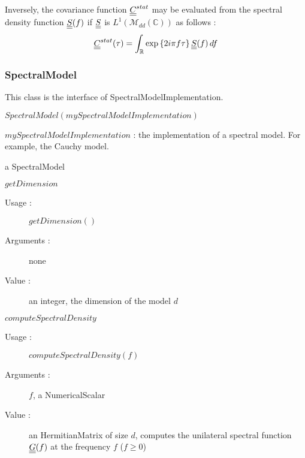 Inversely, the  covariance function ${\underline{\underline{C}}}^{stat}$ may be evaluated from the spectral density function ${\underline{\underline{S}}}(f)$  if ${\underline{\underline{S}}}$ is $L^1(\mathcal{M}_{dd}(\mathbb{C}))$ as follows :
\begin{equation} \label{cspectransform}
  {\underline{\underline{C}}}^{stat}(\tau)  = \int_{\mathbb{R}}\exp\left\{  2i\pi f \tau \right\} {\underline{\underline{S}}}(f)\, df
\end{equation}


 \subsubsection{SpectralModel}

This class is the interface of SpectralModelImplementation. \\
\begin{description}

\item[Usage :]  $SpectralModel(mySpectralModelImplementation)$
  \bigskip

\item[Arguments :] $mySpectralModelImplementation$ : the implementation of a spectral model. For example, the Cauchy model.

  \bigskip


\item[Value :] a SpectralModel
  \bigskip

\item[Some methods :]  \rule{0pt}{1em}

  \begin{description}

   \item $getDimension$
    \begin{description}
    \item[Usage :] $getDimension()$
    \item[Arguments :] none
    \item[Value :]   an integer, the dimension of the model $d$
    \end{description}
    \bigskip

 \item $computeSpectralDensity$
    \begin{description}
    \item[Usage :] $computeSpectralDensity(f)$
    \item[Arguments :] $f$,  a NumericalScalar
    \item[Value :] an HermitianMatrix of size $d$, computes the unilateral spectral function ${\underline{\underline{G}}}(f)$ at the frequency $f$ ($f \geq 0$)
    \end{description}
    \bigskip


\end{description}
\end{description}
